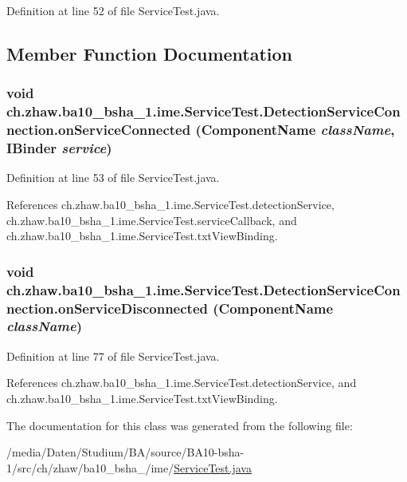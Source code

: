 Definition at line 52 of file ServiceTest.java.

\subsection{Member Function Documentation}
\hypertarget{classch_1_1zhaw_1_1ba10__bsha__1_1_1ime_1_1ServiceTest_1_1DetectionServiceConnection_a52d46455b7ea802c55717fe7b5f51759}{
\subsubsection[{onServiceConnected}]{\setlength{\rightskip}{0pt plus 5cm}void ch.zhaw.ba10\_\-bsha\_\-1.ime.ServiceTest.DetectionServiceConnection.onServiceConnected (ComponentName {\em className}, \/  IBinder {\em service})}}
\label{classch_1_1zhaw_1_1ba10__bsha__1_1_1ime_1_1ServiceTest_1_1DetectionServiceConnection_a52d46455b7ea802c55717fe7b5f51759}


Definition at line 53 of file ServiceTest.java.

References ch.zhaw.ba10\_\-bsha\_\-1.ime.ServiceTest.detectionService, ch.zhaw.ba10\_\-bsha\_\-1.ime.ServiceTest.serviceCallback, and ch.zhaw.ba10\_\-bsha\_\-1.ime.ServiceTest.txtViewBinding.\hypertarget{classch_1_1zhaw_1_1ba10__bsha__1_1_1ime_1_1ServiceTest_1_1DetectionServiceConnection_a308b18246d990cb67a51836ba8ea9f05}{
\subsubsection[{onServiceDisconnected}]{\setlength{\rightskip}{0pt plus 5cm}void ch.zhaw.ba10\_\-bsha\_\-1.ime.ServiceTest.DetectionServiceConnection.onServiceDisconnected (ComponentName {\em className})}}
\label{classch_1_1zhaw_1_1ba10__bsha__1_1_1ime_1_1ServiceTest_1_1DetectionServiceConnection_a308b18246d990cb67a51836ba8ea9f05}


Definition at line 77 of file ServiceTest.java.

References ch.zhaw.ba10\_\-bsha\_\-1.ime.ServiceTest.detectionService, and ch.zhaw.ba10\_\-bsha\_\-1.ime.ServiceTest.txtViewBinding.

The documentation for this class was generated from the following file:\begin{DoxyCompactItemize}
\item 
/media/Daten/Studium/BA/source/BA10-\/bsha-\/1/src/ch/zhaw/ba10\_\-bsha\_/ime/\hyperlink{ServiceTest_8java}{ServiceTest.java}\end{DoxyCompactItemize}
